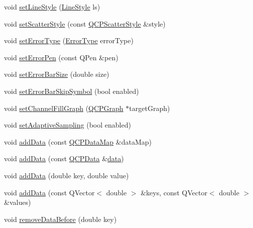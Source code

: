 \begin{DoxyCompactItemize}
\item 
void \mbox{\hyperlink{class_q_c_p_graph_a513fecccff5b2a50ce53f665338c60ff}{set\+Line\+Style}} (\mbox{\hyperlink{class_q_c_p_graph_ad60175cd9b5cac937c5ee685c32c0859}{Line\+Style}} ls)
\item 
void \mbox{\hyperlink{class_q_c_p_graph_a12bd17a8ba21983163ec5d8f42a9fea5}{set\+Scatter\+Style}} (const \mbox{\hyperlink{class_q_c_p_scatter_style}{Q\+C\+P\+Scatter\+Style}} \&style)
\item 
void \mbox{\hyperlink{class_q_c_p_graph_ac3614d799c3894f2bc646e99c7f73d38}{set\+Error\+Type}} (\mbox{\hyperlink{class_q_c_p_graph_ad23b514404bd2cb3216f57c90904d6af}{Error\+Type}} error\+Type)
\item 
void \mbox{\hyperlink{class_q_c_p_graph_abd4c7f81939e10776ea64603a704f22a}{set\+Error\+Pen}} (const Q\+Pen \&pen)
\item 
void \mbox{\hyperlink{class_q_c_p_graph_a10f50c5495ce45ef559ec2066194a335}{set\+Error\+Bar\+Size}} (double size)
\item 
void \mbox{\hyperlink{class_q_c_p_graph_ab1c1ee03d8dd94676a564e5e5f11aac2}{set\+Error\+Bar\+Skip\+Symbol}} (bool enabled)
\item 
void \mbox{\hyperlink{class_q_c_p_graph_a2d03156df1b64037a2e36cfa50351ca3}{set\+Channel\+Fill\+Graph}} (\mbox{\hyperlink{class_q_c_p_graph}{Q\+C\+P\+Graph}} $\ast$target\+Graph)
\item 
void \mbox{\hyperlink{class_q_c_p_graph_ab468cd600160f327836aa0644291e64c}{set\+Adaptive\+Sampling}} (bool enabled)
\item 
void \mbox{\hyperlink{class_q_c_p_graph_aa5c6181d84db72ce4dbe9dc15a34ef4f}{add\+Data}} (const \mbox{\hyperlink{qcustomplot_8h_a84a9c4a4c2216ccfdcb5f3067cda76e3}{Q\+C\+P\+Data\+Map}} \&data\+Map)
\item 
void \mbox{\hyperlink{class_q_c_p_graph_a80cc91e1e0ef77eb50afc5b366d0efd9}{add\+Data}} (const \mbox{\hyperlink{class_q_c_p_data}{Q\+C\+P\+Data}} \&\mbox{\hyperlink{class_q_c_p_graph_acde1c0d1f6a817930489548396e6b3e6}{data}})
\item 
void \mbox{\hyperlink{class_q_c_p_graph_a0bf98b1972286cfb7b1c4b7dd6ae2012}{add\+Data}} (double key, double value)
\item 
void \mbox{\hyperlink{class_q_c_p_graph_ab6da6377541fe80d892a9893a92db9c6}{add\+Data}} (const Q\+Vector$<$ double $>$ \&keys, const Q\+Vector$<$ double $>$ \&values)
\item 
void \mbox{\hyperlink{class_q_c_p_graph_a9fe0b3e54e8c7b61319bd03337e21e99}{remove\+Data\+Before}} (double key)

\end{DoxyCompactItemize}
